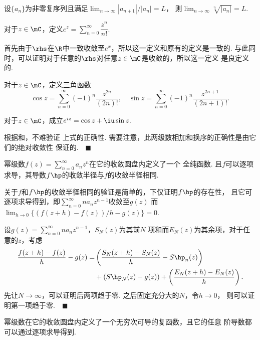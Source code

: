   \begin{thm}
    设$\{a_n\}$为非零复序列且满足$\lim_{n\to\infty}|a_{n+1}|/|a_n|=L$，
    则$\lim_{n\to\infty}\sqrt[n]{|a_n|}=L$.
  \end{thm}

  \begin{defi}[指数函数]
    \label{defi: 指数函数}
    对于$z\in\mC$，定义$e^z = \sum\limits_{n=0}^\infty\dfrac{z^n}{n!}$.
  \end{defi}
  \remark
    首先由于$\rhs$在$\R$中一致收敛至$e^x$，所以这一定义和原有的定义是一致的.
    与此同时，可以证明对于任意的$\rhs$对任意$z\in\mC$是收敛的，所以这一定义
    是良定义的.

  \begin{defi}[三角函数]
    \label{defi: 三角函数}
    对于$z\in\mC$，定义三角函数
    \[
      \cos z = \sum_{n=0}^\infty(-1)^n\frac{z^{2n}}{(2n)!},\quad
      \sin z = \sum_{n=0}^\infty(-1)^n\frac{z^{2n+1}}{(2n+1)!}.
    \]
  \end{defi}

  \begin{thm}[Euler公式]
    \label{thm: Euler公式}
    对于$z\in\mC$，成立$e^{iz} = \cos z + \iu\sin z$.
  \end{thm}
  \proof
    根据和，不难验证
    上式的正确性. 需要注意，此两级数相加和换序的正确性是由它们的绝对收敛性
    保证的.$\quad\blacksquare$

  \begin{thm}
    幂级数$f(z)=\sum_{n=0}^\infty a_nz^n$在它的收敛圆盘内定义了一个
    全纯函数. 且$f$可以逐项求导，其导数$f\hp$的收敛半径与$f$的收敛半径相同.
  \end{thm}
  \proof
    关于$f$和$f\hp$的收敛半径相同的验证是简单的，下仅证明$f\hp$的存在性，
    且它可逐项求导得到，即$\sum_{n=0}^\infty na_nz^{n-1}$收敛至$g(z)$
    而$\lim_{h\to 0}\{(f(z+h)-f(z))/h - g(z)\} = 0$.\par
    设$g(z)=\sum_{n=0}^\infty na_nz^{n-1}$，$S_N(z)$为其前$N$
    项和而$E_N(z)$为其余项，对于任意的$z$，考虑
    \[\begin{split}
      \frac{f(z+h)-f(z)}{h} - g(z) = &
      \left( \frac{S_N(z+h)-S_N(z)}{h} - S\hp_n(z) \right)\\
      &+ (S\hp_N(z) - g(z)) + \left( \frac{E_N(z+h)-E_N(z)}{h} \right).
    \end{split}\]
    先让$N\to\infty$，可以证明后两项趋于零. 之后固定充分大的$N$，令$h\to 0$，
    则可以证明第一项趋于零.$\quad\blacksquare$

  \begin{cor}
    幂级数在它的收敛圆盘内定义了一个无穷次可导的复函数，且它的任意
    阶导数都可以通过逐项求导得到.
  \end{cor}

